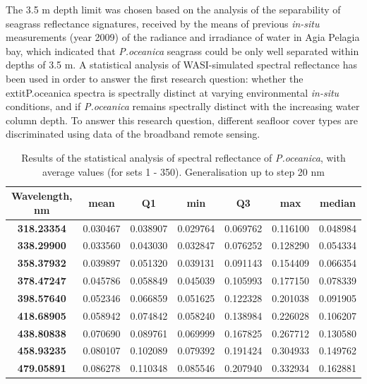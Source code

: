 \documentclass[10pt, a4paper]{article}
\begin{document}
The 3.5 m depth limit was chosen based on the analysis of the separability of seagrass reflectance signatures, received by the means of
previous \textit{in-situ} measurements (year 2009) of the radiance and irradiance of water in Agia Pelagia
bay, which indicated that \textit{P.oceanica} seagrass could be only well separated within depths of 3.5 m.
A statistical analysis of WASI-simulated spectral reflectance has been used in order to answer the first
research question: whether the 	extit{P.oceanica} spectra is spectrally distinct at varying environmental \textit{in-situ}
conditions, and if \textit{P.oceanica} remains spectrally distinct with the increasing water column depth.
To answer this research question, different seafloor cover types are discriminated using data of the
broadband remote sensing.

\begin{table}[htbp]
	\caption{Results of the statistical analysis of spectral reflectance of \textit{P.oceanica}, with average values (for sets 1 - 350). Generalisation up to step 20 nm}\label{tab:4.1}
	\begin{center}
	\begin{tabular}{|c|c|c|c|c|c|c|}
	\hline
	Wavelength, nm & mean & Q1 & min & Q3 & max & median \\ \hline
		\textbf{318.23354} & 0.030467 & 0.038907 & 0.029764 & 0.069762 & 0.116100 & 0.048984 \\ \hline
		\textbf{338.29900} & 0.033560 & 0.043030 & 0.032847 & 0.076252 & 0.128290 & 0.054334 \\ \hline
		\textbf{358.37932} & 0.039897 & 0.051320 & 0.039131 & 0.091143 & 0.154409 & 0.066354 \\ \hline
		\textbf{378.47247} & 0.045786 & 0.058849 & 0.045039 & 0.105993 & 0.177150 & 0.078339 \\ \hline
		\textbf{398.57640} & 0.052346 & 0.066859 & 0.051625 & 0.122328 & 0.201038 & 0.091905 \\ \hline
		\textbf{418.68905} & 0.058942 & 0.074842 & 0.058240 & 0.138984 & 0.226028 & 0.106207 \\ \hline
		\textbf{438.80838} & 0.070690 & 0.089761 & 0.069999 & 0.167825 & 0.267712 & 0.130580 \\ \hline
		\textbf{458.93235} & 0.080107 & 0.102089 & 0.079392 & 0.191424 & 0.304933 & 0.149762 \\ \hline
		\textbf{479.05891} & 0.086278 & 0.110348 & 0.085546 & 0.207940 & 0.332934 & 0.162881 \\ \hline

\end{tabular}
\end{center}
\end{table}
\end{document}
